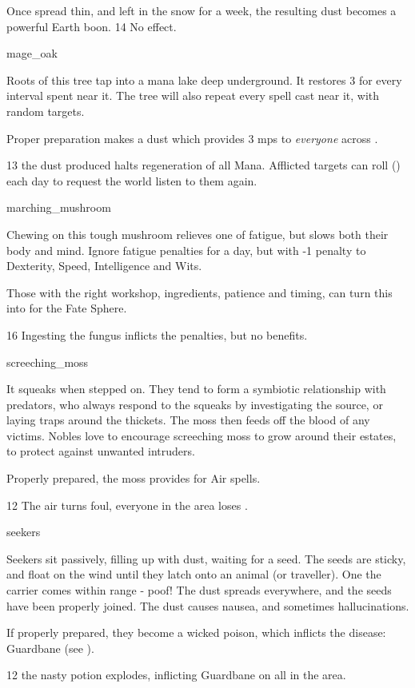 \begin{multicols}{2}
{  Once spread thin, and left in the snow for a week, the resulting dust becomes a powerful Earth \gls{boon}.
    }
{}%
{14}%
{No effect.}%

%
  {mage_oak}%
  {
    Roots of this tree tap into a mana lake deep underground.
    It restores 3  for every \gls{interval} spent near it.
    The tree will also repeat every spell cast near it, with random targets.

    Proper preparation makes a dust which provides 3 \glspl{mp} to \emph{everyone} across .
  }%
  {}%
  {13}%
  {the dust produced halts regeneration of all Mana.
  Afflicted targets can roll  (\tn[10]) each day to request the world listen to them again.}


%
  {marching_mushroom}%
  {
  Chewing on this tough mushroom relieves one of fatigue, but slows both their body and mind.
    Ignore \gls{fatigue} penalties for a day, but with -1 penalty to Dexterity, Speed, Intelligence and Wits.

    Those with the right workshop, ingredients, patience and timing, can turn this into  for the Fate Sphere.
    }
{}%
{16}%
{Ingesting the fungus inflicts the penalties, but no benefits.}%

%
  {screeching_moss}%
  {
  It squeaks when stepped on.
  They tend to form a symbiotic relationship with predators, who always respond to the squeaks by investigating the source, or laying traps around the thickets.
  The moss then feeds off the blood of any victims.
  Nobles love to encourage screeching moss to grow around their estates, to protect against unwanted intruders.

  Properly prepared, the moss provides  for Air spells.
    }
  {}%
  {12}%
  {The air turns foul, everyone in the \gls{area} loses .}%

%
  {seekers}%
  {
  Seekers sit passively, filling up with dust, waiting for a seed.
  The seeds are sticky, and float on the wind until they latch onto an animal (or traveller).
  One the carrier comes within range - poof!
  The dust spreads everywhere, and the seeds have been properly joined.
  The dust causes nausea, and sometimes hallucinations.

  If properly prepared, they become a wicked poison, which inflicts the disease: Guardbane (see ).
    }
  {}%
  {12}%
  {the nasty potion explodes, inflicting Guardbane on all in the \gls{area}.}%


\end{multicols}
